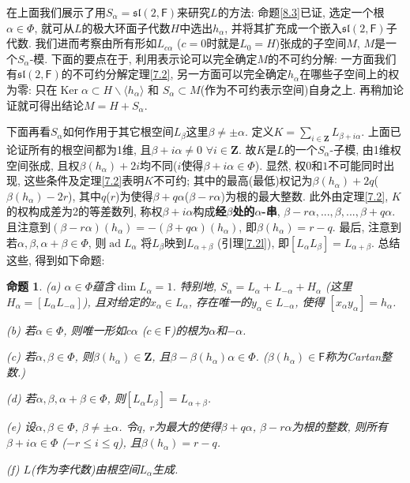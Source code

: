 \documentclass{ctexart}%
\newtheorem{proposition}{命题}
\theoremstyle{definition}
\theoremstyle{remark}
\DeclareMathOperator{\ad}{ad}
\DeclareMathOperator{\Ker}{Ker}
\begin{document}
在上面我们展示了用$S_\alpha = \mathfrak{sl}(2,\mathsf{F})$来研究$L$的方法: 命题\ref{8.3}已证, 选定一个根$\alpha\in \Phi$, 就可从$L$的极大环面子代数$H$中选出$h_\alpha$, 并将其扩充成一个嵌入$\mathfrak{sl}(2,\mathsf{F})$子代数. 我们进而考察由所有形如$L_{c\alpha}$ ($c=0$时就是$L_0=H$)张成的子空间$M$, $M$是一个$S_\alpha$-模. 下面的要点在于, 利用表示论可以完全确定$M$的不可约分解: 一方面我们有$\mathfrak{sl}(2,\mathsf{F})$的不可约分解定理\ref{7.2}, 另一方面可以完全确定$h_\alpha$在哪些子空间上的权为零: 只在$\Ker \alpha \subset H\backslash \langle h_\alpha\rangle$ 和 $S_\alpha\subset M$(作为不可约表示空间)自身之上. 再稍加论证就可得出结论$M=H+S_\alpha$.

下面再看$S_\alpha$如何作用于其它根空间$L_\beta$这里$\beta \neq \pm \alpha$. 定义$K = \sum_{i \in \mathbf{Z}} L_{\beta+ i \alpha}$. 上面已论证所有的根空间都为1维, 且$\beta+i\alpha\neq 0$ $\forall i\in \mathbf{Z}$. 故$K$是$L$的一个$S_\alpha$-子模, 由1维权空间张成, 且权$\beta(h_\alpha)+2i$均不同($i$使得$\beta+i\alpha \in \Phi$). 显然, 权$0$和$1$不可能同时出现, 这些条件及定理\ref{7.2}表明$K$不可约; 其中的最高(最低)权记为$\beta(h_\alpha)+2q$($\beta(h_\alpha)-2r$), 其中$q$($r$)为使得$\beta+q\alpha$($\beta-r\alpha$)为根的最大整数. 此外由定理\ref{7.2}, $K$的权构成差为2的等差数列, 称权$\beta+i\alpha$构成\textbf{经$\beta$处的$\alpha$-串}, $\beta-r\alpha,...,\beta,...,\beta+q\alpha$. 且注意到$(\beta-r\alpha)(h_\alpha) = - (\beta+q\alpha)(h_\alpha)$, 即$\beta(h_\alpha) = r-q$. 最后, 注意到若$\alpha,\beta,\alpha+\beta\in \Phi$, 则$\ad L_\alpha$ 将$L_\beta$映到$L_{\alpha+\beta}$ (引理\ref{7.2l}), 即$[L_\alpha L_\beta]=L_{\alpha+\beta}$. 总结这些, 得到如下命题:

\begin{proposition}\label{8.4}
(a) $\alpha \in \Phi$蕴含$\dim L_\alpha = 1$. 特别地, $S_\alpha = L_\alpha + L_{-\alpha} + H_\alpha$ (这里$H_\alpha = [L_\alpha L_{-\alpha}]$), 且对给定的$x_\alpha \in L_\alpha$, 存在唯一的$y_\alpha \in L_{-\alpha}$, 使得 $[x_\alpha y_\alpha] = h_\alpha$.

(b) 若$\alpha \in \Phi$, 则唯一形如$c\alpha$ ($c\in \mathsf{F}$)的根为$\alpha$和$-\alpha$.

(c) 若$\alpha, \beta\in \Phi$, 则$\beta(h_\alpha) \in \mathbf{Z}$, 且$\beta-\beta(h_\alpha)\alpha \in \Phi$. ($\beta(h_\alpha) \in \mathsf{F}$称为Cartan整数.)

(d) 若$\alpha,\beta,\alpha+\beta \in \Phi$, 则$[L_\alpha L_\beta] = L_{\alpha+\beta}$.

(e) 设$\alpha,\beta \in \Phi$, $\beta \neq \pm \alpha$. 令$q$, $r$为最大的使得$\beta+q\alpha$, $\beta-r\alpha$为根的整数, 则所有$\beta+i\alpha \in \Phi$ ($-r\leq i\leq q$), 且$\beta(h_\alpha) = r-q$.

(f) $L$(作为李代数)由根空间$L_\alpha$生成.
\end{proposition}
\end{document}
